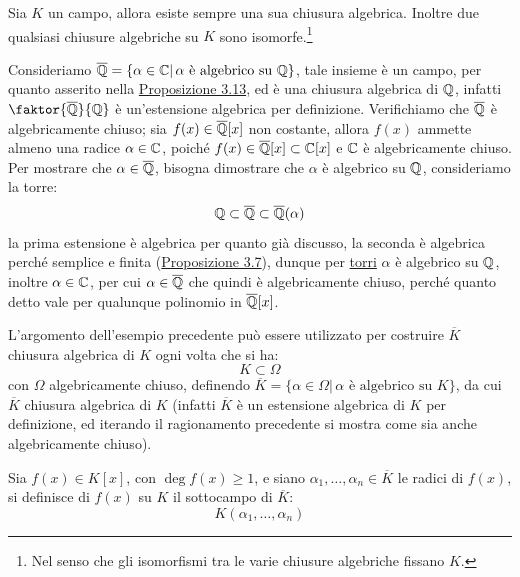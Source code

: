 \documentclass[11pt]{scrartcl}
\begin{document}
\begin{theorem}
    \label{3.25}
    Sia $K$ un campo, allora esiste sempre una sua chiusura algebrica. Inoltre due qualsiasi chiusure algebriche su $K$ sono isomorfe.\footnote{Nel senso che gli isomorfismi tra le varie chiusure algebriche fissano $K$.}
\end{theorem}

\begin{example}
    Consideriamo $\overline{\mathbb Q} = \{\alpha \in \mathbb C | \, \text{$\alpha$ è algebrico su $\mathbb Q$}\}$, tale insieme è un campo, per quanto asserito nella
    \hyperref[3.13]{Proposizione 3.13}, ed è una chiusura algebrica di $\mathbb Q$, infatti $\faktor{\overline\QQ}{\QQ}$ è un'estensione algebrica per definizione.
    Verifichiamo che $\overline{\mathbb Q}$ è algebricamente chiuso; sia $f(x) \in \overline{\mathbb Q}[x]$ non costante, allora $f(x)$ ammette almeno una radice $\alpha \in \mathbb C$, poiché
    $f(x) \in \overline{\mathbb Q}[x] \subset \mathbb C[x]$ e $\mathbb C$ è algebricamente chiuso. Per mostrare che $\alpha \in \overline{\mathbb Q}$, bisogna
    dimostrare che $\alpha$ è algebrico su $\mathbb Q$, consideriamo la torre:
    \[ \mathbb Q \subset \overline {\mathbb Q} \subset \overline{\mathbb Q} (\alpha)
        \]
    la prima estensione è algebrica per quanto già discusso, la seconda è algebrica perché semplice e finita (\hyperref[3.7]{Proposizione 3.7}), dunque per \hyperref[torri]{torri} $\alpha$
    è algebrico su $\mathbb Q$, inoltre $\alpha \in \mathbb C$, per cui $\alpha \in \overline{\mathbb Q}$ che quindi è algebricamente chiuso, perché quanto detto vale per qualunque polinomio in $\overline{\mathbb Q}[x]$.
\end{example}

\begin{remark}
    L'argomento dell'esempio precedente può essere utilizzato per costruire $\overline K$ chiusura algebrica di $K$ ogni volta che si ha:
    \[ K \subset \Omega
        \]
    con $\Omega$ algebricamente chiuso, definendo $\overline K = \{\alpha \in \Omega |  \, \text{$\alpha$ è algebrico su $K$}\}$, da cui $\overline K$ chiusura algebrica di $K$ (infatti $\overline K$ è un estensione algebrica 
    di $K$ per definizione, ed iterando il ragionamento precedente si mostra come sia anche algebricamente chiuso).
\end{remark}

\begin{definition}
    Sia $f(x) \in K[x]$, con $\deg f(x) \geq 1$, e siano $\alpha_1,\ldots,\alpha_n \in \overline K$ le radici di $f(x)$, si definisce  di $f(x)$ su $K$ il sottocampo di $\overline K$:
    \[ K(\alpha_1,\ldots,\alpha_n)
        \]
\end{definition}
\end{document}
